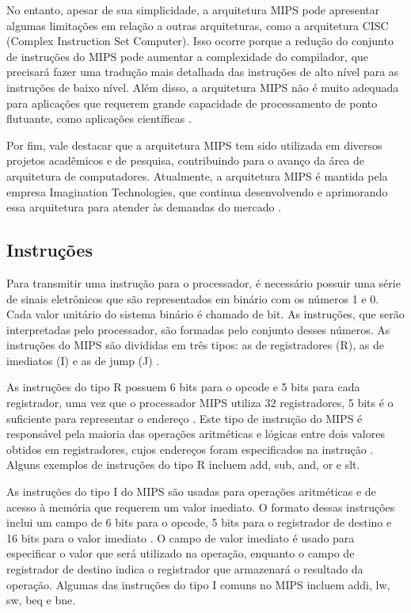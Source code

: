 \documentclass[
	12pt,				%
	openright,			%
	a4paper,			%
	english,			%
	french,				%
	spanish,			%
	brazil,				%
	]{abntex2}
\begin{document}
No entanto, apesar de sua simplicidade, a arquitetura MIPS pode apresentar algumas limitações em relação a outras arquiteturas, como a arquitetura CISC (Complex Instruction Set Computer). Isso ocorre porque a redução do conjunto de instruções do MIPS pode aumentar a complexidade do compilador, que precisará fazer uma tradução mais detalhada das instruções de alto nível para as instruções de baixo nível. Além disso, a arquitetura MIPS não é muito adequada para aplicações que requerem grande capacidade de processamento de ponto flutuante, como aplicações científicas \cite{goodman2015}.

Por fim, vale destacar que a arquitetura MIPS tem sido utilizada em diversos projetos acadêmicos e de pesquisa, contribuindo para o avanço da área de arquitetura de computadores. Atualmente, a arquitetura MIPS é mantida pela empresa Imagination Technologies, que continua desenvolvendo e aprimorando essa arquitetura para atender às demandas do mercado \cite{patterson2018}.

\subsection{Instruções}
Para transmitir uma instrução para o processador, é necessário possuir uma série de sinais eletrônicos que são representados em binário com os números 1 e 0. Cada valor unitário do sistema binário é chamado de bit. As instruções, que serão interpretadas pelo processador, são formadas pelo conjunto desses números. As instruções do MIPS são divididas em três tipos: as de registradores (R), as de imediatos (I) e as de jump (J) \cite{stallings2017}. 

As instruções do tipo R possuem 6 bits para o opcode e 5 bits para cada registrador, uma vez que o processador MIPS utiliza 32 registradores, 5 bits é o suficiente para representar o endereço \cite{stallings2017}. Este tipo de instrução do MIPS é responsável pela maioria das operações aritméticas e lógicas entre dois valores obtidos em registradores, cujos endereços foram especificados na instrução \cite{britton2003}. Alguns exemplos de instruções do tipo R incluem add, sub, and, or e slt. 

As instruções do tipo I do MIPS são usadas para operações aritméticas e de acesso à memória que requerem um valor imediato. O formato dessas instruções inclui um campo de 6 bits para o opcode, 5 bits para o registrador de destino e 16 bits para o valor imediato \cite{mips32}. O campo de valor imediato é usado para especificar o valor que será utilizado na operação, enquanto o campo de registrador de destino indica o registrador que armazenará o resultado da operação. Algumas das instruções do tipo I comuns no MIPS incluem addi, lw, sw, beq e bne.
\end{document}
